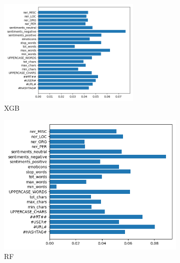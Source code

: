 \begin{figure}[htbp]
     \centering
     \begin{subfigure}[b]{\textwidth}
         \centering
         \includegraphics[width=0.75\textwidth]{assets/img/xgb_imp.png}
         \caption{\ac{XGB}}
         \label{fig:results:feat-imp::xgb}
         \vspace{0.6cm}
     \end{subfigure}
     \hfill
     \begin{subfigure}[b]{0.48\textwidth}
         \centering
         \includegraphics[width=\textwidth]{assets/img/rf_imp.png}
         \caption{\ac{RF}}
         \label{fig:results:feat-imp::rf}
     \end{subfigure}
     \hfill
     \begin{subfigure}[b]{0.48\textwidth}
         \centering

\end{subfigure}
\end{figure}
